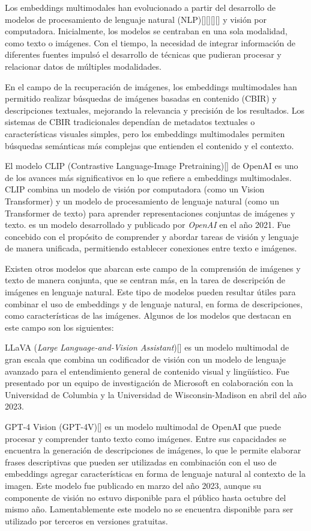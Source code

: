 Los embeddings multimodales han evolucionado a partir del desarrollo de modelos de procesamiento de lenguaje natural (NLP)[\cite{gpt2}][\cite{gpt3}][\cite{bert}][\cite{gpt4}] y visión por computadora. Inicialmente, los modelos se centraban en una sola modalidad, como texto o imágenes. Con el tiempo, la necesidad de integrar información de diferentes fuentes impulsó el desarrollo de técnicas que pudieran procesar y relacionar datos de múltiples modalidades.

En el campo de la recuperación de imágenes, los embeddings multimodales han permitido realizar búsquedas de imágenes basadas en contenido (CBIR) y descripciones textuales, mejorando la relevancia y precisión de los resultados. Los sistemas de CBIR tradicionales dependían de metadatos textuales o características visuales simples, pero los embeddings multimodales permiten búsquedas semánticas más complejas que entienden el contenido y el contexto.

El modelo CLIP (Contrastive Language-Image Pretraining)[\cite{clip-paper}] de OpenAI es uno de los avances más significativos en lo que refiere a  embeddings multimodales. CLIP combina un modelo de visión por computadora (como un Vision Transformer) y un modelo de procesamiento de lenguaje natural (como un Transformer de texto) para aprender representaciones conjuntas de imágenes y texto. 
es un modelo desarrollado y publicado por \textit{OpenAI} en el a\~no 2021. Fue concebido con el prop\'osito de comprender y abordar tareas de visi\'on y lenguaje de manera unificada, permitiendo establecer conexiones entre texto e im\'agenes.

Existen otros modelos que abarcan este campo de la comprensión de imágenes y texto de manera conjunta, que se centran más, en la tarea de descripción de imágenes en lenguaje natural. Este tipo de modelos pueden resultar útiles para combinar el uso de embeddings y de lenguaje natural, en forma de descripciones, como características de las imágenes. Algunos de los modelos que destacan en este campo son los siguientes:

LLaVA (\textit{Large Language-and-Vision Assistant})[\cite{llava}] es un modelo multimodal de gran escala que combina un codificador de visi\'on con un modelo de lenguaje avanzado para el entendimiento general de contenido visual y lingü\'istico. Fue presentado por un equipo de investigaci\'on de Microsoft en colaboraci\'on con la Universidad de Columbia y la Universidad de Wisconsin-Madison en abril del a\~no 2023.

GPT-4 Vision (GPT-4V)[\cite{gpt-4v}] es un modelo multimodal de OpenAI que puede procesar y comprender tanto texto como imágenes. Entre sus capacidades se encuentra la generación de descripciones de imágenes, lo que le permite elaborar frases descriptivas que pueden ser utilizadas en combinaci\'on con el uso de embeddings agregar características en forma de lenguaje natural al contexto de la imagen. Este modelo fue publicado en marzo del a\~no 2023, aunque su componente de visi\'on no estuvo disponible para el p\'ublico hasta octubre del mismo a\~no. Lamentablemente este modelo no se encuentra disponible para ser utilizado por terceros en versiones gratuitas.


